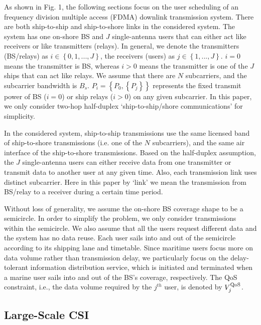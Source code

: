 \documentclass[journal]{IEEEtran}
\begin{document}
   As shown in Fig. 1, the following sections focus on the user scheduling of an frequency division multiple access (FDMA) downlink transmission system. There are both ship-to-ship and ship-to-shore links in the considered system. The system has one on-shore BS and $J$ single-antenna users that can either act like receivers or like transmitters (relays). In general, we denote the transmitters (BS/relays) as $i \in \left\{ {0,1,...,J} \right\}$, the receivers (users) as $j \in \left\{ {1,...,J} \right\}$. $i=0$ means the transmitter is BS, whereas $i>0$ means the transmitter is one of the $J$ ships that can act like relays. We assume that there are $N$ subcarriers, and the subcarrier bandwidth is ${B_s}$. $P_i = \left\{ {P_0,\left\{ {P_j} \right\}} \right\}$ represents the fixed transmit power of BS ($i=0$) or ship relays ($i>0$) on any given subcarrier. In this paper, we only consider two-hop half-duplex `ship-to-ship/shore communications' for simplicity. 
   
   In the considered system, ship-to-ship transmissions use the same licensed band of ship-to-shore transmissions (i.e. one of the $N$ subcarriers), and the same air interface of the ship-to-shore transmissions. 
   Based on the half-duplex assumption, the $J$ single-antenna users can either receive data from one transmitter or transmit data to another user at any given time. 
   Also, each transmission link uses distinct subcarrier. Here in this paper by `link' we mean the transmission from BS/relay to a receiver during a certain time period. 
   
   Without loss of generality, we assume the on-shore BS coverage shape to be a semicircle. 
   In order to simplify the problem, we only consider transmissions within the semicircle. We also assume that all the users request different data and the system has no data reuse. 
   Each user sails into and out of the semicircle according to its shipping lane and timetable. 
   Since maritime users focus more on data volume rather than transmission delay, we particularly focus on the delay-tolerant information distribution service, which is initiated and terminated when a marine user sails into and out of the BS's coverage, respectively. 
   The QoS constraint, i.e., the data volume required by the ${j^{th}}$ user, is denoted by $V_j^{\rm{QoS}}$. 
   
   \subsection{Large-Scale CSI}
   
\end{document}
